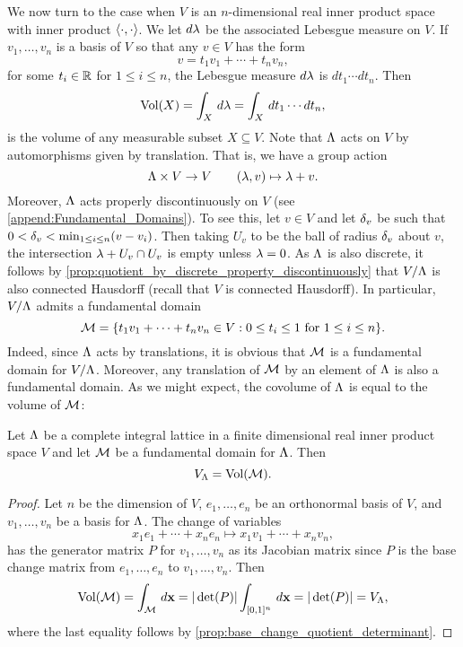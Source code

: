     We now turn to the case when $V$ is an $n$-dimensional real inner product space with inner product $\langle\cdot,\cdot\rangle$. We let $d\lambda$ be the associated Lebesgue measure on $V$. If $v_{1},\ldots,v_{n}$ is a basis of $V$ so that any $v \in V$ has the form
    \[
      v = t_{1}v_{1}+\cdots+t_{n}v_{n},
    \]
    for some $t_{i} \in \mathbb{R}$ for $1 \le i \le n$, the Lebesgue measure $d\lambda$ is $dt_{1} \cdots dt_{n}$. Then
    \[
      \operatorname{\mathrm{Vol}}(X) = \int_{X}\,d\lambda = \int_{X}\,dt_{1} \cdots dt_{n},
    \]
    is the volume of any measurable subset $X \subseteq V$. Note that $\Lambda$ acts on $V$ by automorphisms given by translation. That is, we have a group action
    \[
      \Lambda \times V \to V \qquad (\lambda,v) \mapsto \lambda+v.
    \]
    Moreover, $\Lambda$ acts properly discontinuously on $V$ (see \cref{append:Fundamental_Domains}). To see this, let $v \in V$ and let $\delta_{v}$ be such that $0 < \delta_{v} < \min_{1 \le i \le n}(v-v_{i})$. Then taking $U_{v}$ to be the ball of radius $\delta_{v}$ about $v$, the intersection $\lambda+U_{v} \cap U_{v}$ is empty unless $\lambda = 0$. As $\Lambda$ is also discrete, it follows by \cref{prop:quotient_by_discrete_property_discontinuously} that $V/\Lambda$ is also connected Hausdorff (recall that $V$ is connected Hausdorff). In particular, $V/\Lambda$ admits a fundamental domain
    \[
      \mathcal{M} = \{t_{1}v_{1}+\cdots+t_{n}v_{n} \in V:\text{$0 \le t_{i} \le 1$ for $1 \le i \le n$}\}.
    \]
    Indeed, since $\Lambda$ acts by translations, it is obvious that $\mathcal{M}$ is a fundamental domain for $V/\Lambda$. Moreover, any translation of $\mathcal{M}$ by an element of $\Lambda$ is also a fundamental domain. As we might expect, the covolume of $\Lambda$ is equal to the volume of $\mathcal{M}$:

    \begin{proposition}\label{prop:covolume_equals_volume_of_fundamental_domain}
      Let $\Lambda$ be a complete integral lattice in a finite dimensional real inner product space $V$ and let $\mathcal{M}$ be a fundamental domain for $\Lambda$. Then
      \[
        V_{\Lambda} = \operatorname{\mathrm{Vol}}(\mathcal{M}).
      \]
    \end{proposition}
    \begin{proof}
      Let $n$ be the dimension of $V$, $e_{1},\ldots,e_{n}$ be an orthonormal basis of $V$, and $v_{1},\ldots,v_{n}$ be a basis for $\Lambda$. The change of variables
      \[
        x_{1}e_{1}+\cdots+x_{n}e_{n} \mapsto x_{1}v_{1}+\cdots+x_{n}v_{n},
      \]
      has the generator matrix $P$ for $v_{1},\ldots,v_{n}$ as its Jacobian matrix since $P$ is the base change matrix from $e_{1},\ldots,e_{n}$ to $v_{1},\ldots,v_{n}$. Then
      \[
        \operatorname{\mathrm{Vol}}(\mathcal{M}) = \int_{\mathcal{M}}\,d\mathbf{x} = |\det(P)|\int_{[0,1]^{n}}\,d\mathbf{x} = |\det(P)| = V_{\Lambda},
      \]
      where the last equality follows by \cref{prop:base_change_quotient_determinant}.
    \end{proof}

